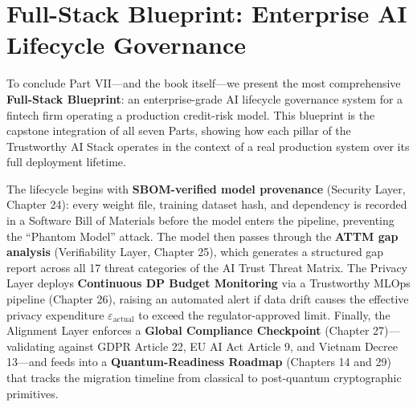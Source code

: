 \section{Full-Stack Blueprint: Enterprise AI Lifecycle Governance}
\label{sec:blueprint_lifecycle}

To conclude Part VII---and the book itself---we present the most comprehensive \textbf{Full-Stack Blueprint}: an enterprise-grade AI lifecycle governance system for a fintech firm operating a production credit-risk model. This blueprint is the capstone integration of all seven Parts, showing how each pillar of the Trustworthy AI Stack operates in the context of a real production system over its full deployment lifetime.

The lifecycle begins with \textbf{SBOM-verified model provenance} (Security Layer, Chapter 24): every weight file, training dataset hash, and dependency is recorded in a Software Bill of Materials before the model enters the pipeline, preventing the ``Phantom Model'' attack. The model then passes through the \textbf{ATTM gap analysis} (Verifiability Layer, Chapter 25), which generates a structured gap report across all 17 threat categories of the AI Trust Threat Matrix. The Privacy Layer deploys \textbf{Continuous DP Budget Monitoring} via a Trustworthy MLOps pipeline (Chapter 26), raising an automated alert if data drift causes the effective privacy expenditure $\varepsilon_{\text{actual}}$ to exceed the regulator-approved limit. Finally, the Alignment Layer enforces a \textbf{Global Compliance Checkpoint} (Chapter 27)---validating against GDPR Article 22, EU AI Act Article 9, and Vietnam Decree 13---and feeds into a \textbf{Quantum-Readiness Roadmap} (Chapters 14 and 29) that tracks the migration timeline from classical to post-quantum cryptographic primitives.

